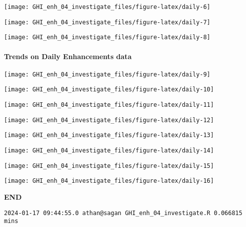 \documentclass[
  10pt,
  a4paper,oneside]{article}
\begin{document}
\begin{center}\texttt{[image: GHI\_enh\_04\_investigate\_files/figure-latex/daily-6]} \end{center}

\begin{center}\texttt{[image: GHI\_enh\_04\_investigate\_files/figure-latex/daily-7]} \end{center}

\begin{center}\texttt{[image: GHI\_enh\_04\_investigate\_files/figure-latex/daily-8]} \end{center}

\newpage

\hypertarget{trends-on-daily-enhancements-data}{%
\paragraph{Trends on Daily Enhancements data}\label{trends-on-daily-enhancements-data}}

\begin{center}\texttt{[image: GHI\_enh\_04\_investigate\_files/figure-latex/daily-9]} \end{center}

\begin{center}\texttt{[image: GHI\_enh\_04\_investigate\_files/figure-latex/daily-10]} \end{center}

\begin{center}\texttt{[image: GHI\_enh\_04\_investigate\_files/figure-latex/daily-11]} \end{center}

\begin{center}\texttt{[image: GHI\_enh\_04\_investigate\_files/figure-latex/daily-12]} \end{center}

\begin{center}\texttt{[image: GHI\_enh\_04\_investigate\_files/figure-latex/daily-13]} \end{center}

\begin{center}\texttt{[image: GHI\_enh\_04\_investigate\_files/figure-latex/daily-14]} \end{center}

\begin{center}\texttt{[image: GHI\_enh\_04\_investigate\_files/figure-latex/daily-15]} \end{center}

\begin{center}\texttt{[image: GHI\_enh\_04\_investigate\_files/figure-latex/daily-16]} \end{center}

\textbf{END}

\begin{verbatim}
2024-01-17 09:44:55.0 athan@sagan GHI_enh_04_investigate.R 0.066815 mins
\end{verbatim}
\end{document}
